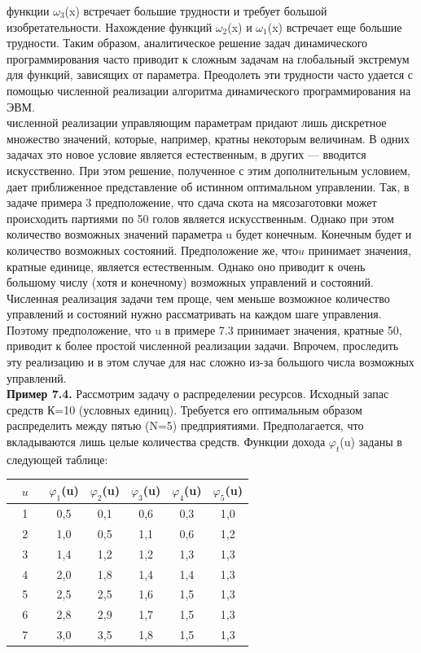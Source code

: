  функции $\omega_3$(x) встречает большие трудности и требует большой изобретательности. Нахождение функций  $\omega_2$(x) и  $\omega_1$(x)
встречает еще большие трудности. Таким образом, аналитическое решение задач динамического программирования часто приводит к сложным задачам на глобальный экстремум для функций, зависящих от параметра. Преодолеть эти трудности часто удается с помощью численной реализации алгоритма динамического программирования на ЭВМ.\\
 численной реализации управляющим параметрам придают лишь дискретное множество значений, которые, например, кратны некоторым величинам. В одних задачах это новое условие является естественным, в других  — вводится  искусственно. При этом решение, полученное с этим дополнительным условием, дает приближенное представление об истинном оптимальном управлении. Так, в задаче примера 3 предположение, что сдача скота на мясозаготовки может происходить партиями по 50 голов является искусственным. Однако при этом количество возможных значений параметра u будет конечным. Конечным будет и количество возможных состояний. Предположение же, что$u$ принимает значения, кратные единице, является естественным. Однако оно приводит к очень большому числу (хотя и конечному) возможных управлений и состояний. Численная реализация задачи тем проще, чем меньше возможное количество управлений и состояний нужно рассматривать на каждом шаге управления. Поэтому предположение, что u  в примере 7.3 принимает значения, кратные 50, приводит к более простой численной реализации задачи. Впрочем, проследить эту реализацию и в этом случае для нас сложно из-за большого числа возможных управлений.\\
\indent\textbf{Пример 7.4.} Рассмотрим задачу о распределении ресурсов. Исходный запас средств К=10 (условных единиц). Требуется  его оптимальным образом распределить между пятью (N=5) предприятиями. Предполагается, что вкладываются лишь целые количества средств. Функции дохода $\varphi_t$(u) заданы  в следующей таблице:
\begin{center}
\begin{tabular}[c]{|c|c|c|c|c|c|}
\hline
$\mspace{15mu}u\mspace{15mu}$&$\varphi_1$(u)&$\varphi_2$(u)&$\varphi_3$(u)&$\varphi_4$(u)&$\varphi_5$(u) \\
\hline
1&0,5&0,1&0,6&0,3&1,0\\  [0.02cm]
\hline
2&1,0&0,5&1,1&0,6&1,2\\ [0.02cm]
\hline
3&1,4&1,2&1,2&1,3&1,3\\ [0.02cm]
\hline
4&2,0&1,8&1,4&1,4&1,3\\ [0.02cm]
\hline
5&2,5&2,5&1,6&1,5&1,3\\ [0.02cm]
\hline
6&2,8&2,9&1,7&1,5&1,3\\ [0.02cm]
\hline
7&3,0&3,5&1,8&1,5&1,3\\ [0.02cm]
\hline
\end{tabular}
\end{center}

